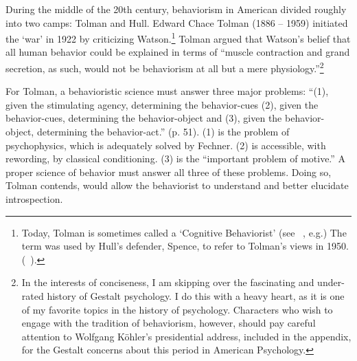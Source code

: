 \begin{refsection}
During the middle of the 20th century, behaviorism in American divided roughly into two camps: Tolman and Hull. Edward Chace Tolman (1886 – 1959) initiated the `war' in 1922 by criticizing Watson.\footnote{Today, Tolman is sometimes called a ‘Cognitive Behaviorist’ (see ~\citep{HOLLAND:2008ci}, e.g.) The term was used by Hull’s defender, Spence, to refer to Tolman’s views in 1950. (~\citep{Spence:1950fx}).} Tolman argued that Watson's belief that all human behavior could be explained in terms of “muscle contraction and grand secretion, as such, would not be behaviorism at all but a mere physiology.”\footnote{In the interests of conciseness, I am skipping over the fascinating and under-rated history of Gestalt psychology. I do this with a heavy heart, as it is one of my favorite topics in the history of psychology. Characters who wish to engage with the tradition of behaviorism, however, should pay careful attention to Wolfgang Köhler's presidential address, included in the appendix, for the Gestalt concerns about this period in American Psychology.} ~\citep[p. 45]{Tolman:1922us}

For Tolman, a behavioristic science must answer three major problems: “(1), given the stimulating agency, determining the behavior-cues (2), given the behavior-cues, determining the behavior-object and (3), given the behavior-object, determining the behavior-act.” (p. 51). (1) is the problem of psychophysics, which is adequately solved by Fechner. (2) is accessible, with rewording, by classical conditioning. (3) is the “important problem of motive.” A proper science of behavior must answer all three of these problems. Doing so, Tolman contends, would allow the behaviorist to understand and better elucidate introspection.


\end{refsection}
